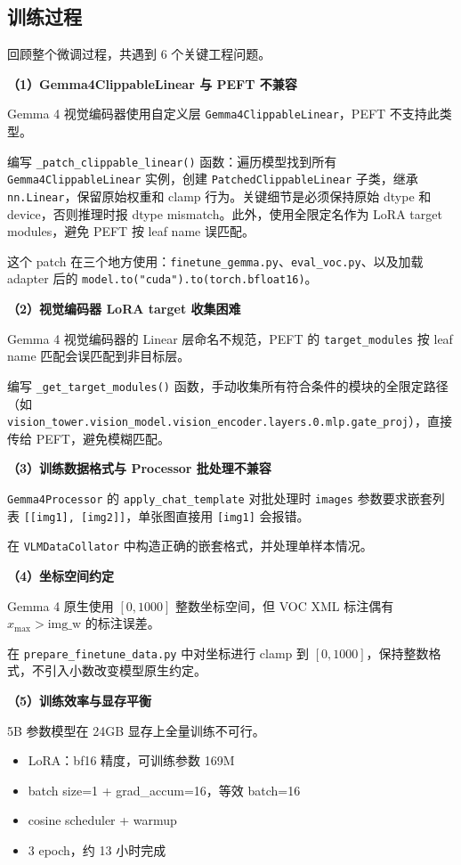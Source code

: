 \documentclass[12pt, a4paper]{article}
\begin{document}
\subsection{训练过程}

回顾整个微调过程，共遇到 6 个关键工程问题。

\textbf{（1）Gemma4ClippableLinear 与 PEFT 不兼容}

Gemma 4 视觉编码器使用自定义层 \texttt{Gemma4ClippableLinear}，PEFT 不支持此类型。

编写 \texttt{\_patch\_clippable\_linear()} 函数：遍历模型找到所有 \texttt{Gemma4ClippableLinear} 实例，创建 \texttt{PatchedClippableLinear} 子类，继承 \texttt{nn.Linear}，保留原始权重和 clamp 行为。关键细节是必须保持原始 dtype 和 device，否则推理时报 dtype mismatch。此外，使用全限定名作为 LoRA target modules，避免 PEFT 按 leaf name 误匹配。

这个 patch 在三个地方使用：\texttt{finetune\_gemma.py}、\texttt{eval\_voc.py}、以及加载 adapter 后的 \texttt{model.to("cuda").to(torch.bfloat16)}。

\textbf{（2）视觉编码器 LoRA target 收集困难}

Gemma 4 视觉编码器的 Linear 层命名不规范，PEFT 的 \texttt{target\_modules} 按 leaf name 匹配会误匹配到非目标层。

编写 \texttt{\_get\_target\_modules()} 函数，手动收集所有符合条件的模块的全限定路径（如 \texttt{vision\_tower.vision\_model.vision\_encoder.layers.0.mlp.gate\_proj}），直接传给 PEFT，避免模糊匹配。

\textbf{（3）训练数据格式与 Processor 批处理不兼容}

\texttt{Gemma4Processor} 的 \texttt{apply\_chat\_template} 对批处理时 \texttt{images} 参数要求嵌套列表 \texttt{[[img1], [img2]]}，单张图直接用 \texttt{[img1]} 会报错。

在 \texttt{VLMDataCollator} 中构造正确的嵌套格式，并处理单样本情况。

\textbf{（4）坐标空间约定}

Gemma 4 原生使用 $[0, 1000]$ 整数坐标空间，但 VOC XML 标注偶有 $x_{\max} > \text{img\_w}$ 的标注误差。

在 \texttt{prepare\_finetune\_data.py} 中对坐标进行 clamp 到 $[0, 1000]$，保持整数格式，不引入小数改变模型原生约定。

\textbf{（5）训练效率与显存平衡}

5B 参数模型在 24GB 显存上全量训练不可行。
\begin{itemize}
    \item LoRA：bf16 精度，可训练参数 169M
    \item batch size=1 + grad\_accum=16，等效 batch=16
    \item cosine scheduler + warmup
    \item 3 epoch，约 13 小时完成
\end{itemize}
\end{document}
